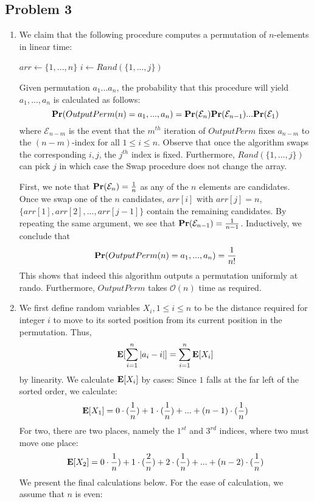 \documentclass[12pt]{article}%
\begin{document}
\subsection*{Problem 3}
\begin{enumerate}
  \item We claim that the following procedure computes a permutation of $n$-elements in linear time:
  \begin{algorithm}
    \begin{algorithmic}[1]
          \State $arr \gets \{1,...,n\}$
            \State $i \gets Rand(\{1,...,j\})$
            \State {}
          \EndFor
        \EndProcedure
    \end{algorithmic}
  \end{algorithm}

  Given permutation $a_1...a_n$, the probability that this procedure will yield $a_1,...,a_n$ is calculated as follows:
  $$ {\bf Pr}(OutputPerm(n) = a_1,..., a_n) = {\bf Pr}(\mathcal{E}_{n}){\bf Pr}(\mathcal{E}_{n-1})...{\bf Pr}(\mathcal{E}_{1})$$
  where $\mathcal{E}_{n-m}$ is the event that the $m^{th}$ iteration of $OutputPerm$ fixes $a_{n-m}$ to the $(n-m)$-index for all $1 \leq i \leq n$.
  Observe that once the algorithm swaps the corresponding $i,j$, the $j^{th}$ index is fixed. Furthermore, $Rand(\{1,...,j\})$ can pick $j$ in which case the Swap procedure does not change the array.

  First, we note that ${\bf Pr}(\mathcal{E}_n) = \frac{1}{n}$ as any of the $n$ elements are candidates. Once we swap one of the $n$ candidates, $arr[i]$ with $arr[j] = n$, $\{arr[1],arr[2],...,arr[j-1]\}$ contain the remaining candidates. By repeating the same argument, we see that
  ${\bf Pr}(\mathcal{E}_{n-1}) = \frac{1}{n-1}$. Inductively, we conclude that
  $${\bf Pr}(OutputPerm(n) = a_1,..., a_n) = \frac{1}{n!} $$ This shows that indeed this algorithm outputs a permutation uniformly at rando. Furthermore, $OutputPerm$ takes $\mathcal{O}(n)$ time as required.
  \item We first define random variables $X_i, 1 \leq i \leq n$ to be the distance required for integer $i$ to move to its sorted position from its current position in the permutation. Thus, $${\bf E}[\sum_{i=1}^n |a_i - i|] = \sum_{i=1}^n {\bf E}[X_i]$$ by linearity. We calculate ${\bf E}[X_i]$ by cases:
  Since $1$ falls at the far left of the sorted order, we calculate:
  \begin{gather*}
   {\bf E}[X_1] = 0\cdot(\frac{1}{n}) + 1 \cdot (\frac{1}{n}) + ... + (n-1) \cdot (\frac{1}{n})
 \end{gather*}
 For two, there are two places, namely the $1^{st}$ and $3^{rd}$ indices, where two must move one place:
 \begin{gather*}
  {\bf E}[X_2] = 0\cdot\frac{1}{n}) + 1 \cdot (\frac{2}{n}) + 2 \cdot (\frac{1}{n}) + ... + (n-2) \cdot (\frac{1}{n})
\end{gather*}
We present the final calculations below. For the ease of calculation, we assume that $n$ is even:


\end{enumerate}
\end{document}
